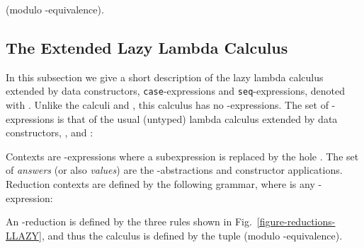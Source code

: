 \documentclass{LMCS}
\theoremstyle{plain}
\theoremstyle{definition}
\newcommand{\FIGURE}{Fig.}
\newcommand{\tcase}{{\tt case}}
\newcommand{\tseq}{{\tt seq}}
\begin{document}
(modulo -equivalence). 

\subsection{\texorpdfstring{The Extended Lazy Lambda Calculus }{The Extended Lazy Lambda Calculus Llcc}}
In this subsection we give a short description of the  lazy lambda 
calculus \cite{abramsky-lazy:90} extended by data constructors, 
\tcase-expressions and \tseq-expressions, denoted with . 
Unlike the calculi  and , this calculus has no 
-expressions.
The set  of -expressions is that of the usual (untyped)
lambda calculus extended by data constructors, , and : 


Contexts  are -expressions where a subexpression is
replaced by the hole .
The set  of {\em answers} (or also {\em values}) are the 
-abstractions and constructor applications. 
Reduction contexts  are defined by the following grammar, where
 is any -expression:


An -reduction is defined by the three rules shown 
in \FIGURE~\ref{figure-reductions-LLAZY}, and thus the calculus  is defined 
by the tuple 
(modulo -equivalence).
\end{document}
